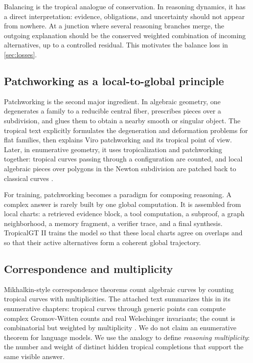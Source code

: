 \documentclass[11pt]{article}
\begin{document}
Balancing is the tropical analogue of conservation.  In reasoning dynamics, it has a direct interpretation: evidence, obligations, and uncertainty should not appear from nowhere.  At a junction where several reasoning branches merge, the outgoing explanation should be the conserved weighted combination of incoming alternatives, up to a controlled residual.  This motivates the balance loss in \cref{sec:losses}.

\subsection{Patchworking as a local-to-global principle}

Patchworking is the second major ingredient.  In algebraic geometry, one degenerates a family to a reducible central fiber, prescribes pieces over a subdivision, and glues them to obtain a nearby smooth or singular object.  The tropical text explicitly formulates the degeneration and deformation problems for flat families, then explains Viro patchworking and its tropical point of view.  Later, in enumerative geometry, it uses tropicalization and patchworking together: tropical curves passing through a configuration are counted, and local algebraic pieces over polygons in the Newton subdivision are patched back to classical curves \cite{itenberg2009}.

For training, patchworking becomes a paradigm for composing reasoning.  A complex answer is rarely built by one global computation.  It is assembled from local charts: a retrieved evidence block, a tool computation, a subproof, a graph neighborhood, a memory fragment, a verifier trace, and a final synthesis.  TropicalGT II trains the model so that these local charts agree on overlaps and so that their active alternatives form a coherent global trajectory.

\subsection{Correspondence and multiplicity}

Mikhalkin-style correspondence theorems count algebraic curves by counting tropical curves with multiplicities.  The attached text summarizes this in its enumerative chapters: tropical curves through generic points can compute complex Gromov-Witten counts and real Welschinger invariants; the count is combinatorial but weighted by multiplicity \cite{itenberg2009}.  We do not claim an enumerative theorem for language models.  We use the analogy to define \emph{reasoning multiplicity}: the number and weight of distinct hidden tropical completions that support the same visible answer.
\end{document}

